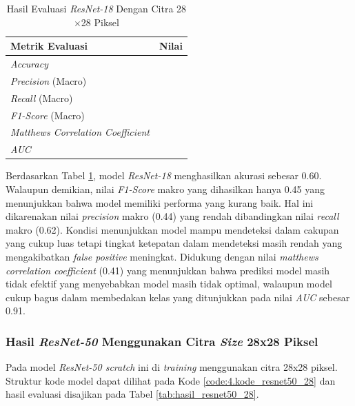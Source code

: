 \begin{table}[H]
    \centering
    \caption{Hasil Evaluasi \textit{ResNet-18} Dengan Citra 28$\times$28 Piksel}
    \label{tab:hasil_resnet18_28}
    \begin{tabular}{>{\raggedright\arraybackslash}m{} 
                    >{\centering\arraybackslash}m{}}
        \toprule
        \textbf{Metrik Evaluasi} & \textbf{Nilai} \\
        \midrule
        \textit{Accuracy} & 0.60 \\
        \textit{Precision} (Macro) & 0.44 \\
        \textit{Recall} (Macro) & 0.62 \\
        \textit{F1-Score} (Macro) & 0.45 \\
        \textit{Matthews Correlation Coefficient} & 0.41 \\
        \textit{AUC} & 0.91 \\
        \bottomrule
    \end{tabular}
\end{table}

Berdasarkan Tabel \ref{tab:hasil_resnet18_28}, model \textit{ResNet-18} 
menghasilkan akurasi sebesar 0.60. Walaupun demikian, nilai \textit{F1-Score} 
makro yang dihasilkan hanya 0.45 yang menunjukkan bahwa model memiliki 
performa yang kurang baik. Hal ini dikarenakan nilai \textit{precision} 
makro (0.44) yang rendah dibandingkan nilai \textit{recall} makro (0.62). 
Kondisi menunjukkan model mampu mendeteksi dalam cakupan yang cukup luas 
tetapi tingkat ketepatan dalam mendeteksi masih rendah yang mengakibatkan 
\textit{false positive} meningkat. Didukung dengan nilai 
\textit{matthews correlation coefficient} (0.41) yang menunjukkan bahwa 
prediksi model masih tidak efektif yang menyebabkan model masih tidak 
optimal, walaupun model cukup bagus dalam membedakan kelas yang ditunjukkan 
pada nilai \textit{AUC} sebesar 0.91. \par


\subsubsection{Hasil \textit{ResNet-50} Menggunakan Citra \textit{Size} 28x28 Piksel} \label{IV.Resnet50_28}
Pada model \textit{ResNet-50 scratch} ini di \textit{training} menggunakan 
citra 28x28 piksel. Struktur kode model dapat dilihat pada Kode \ref{code:4.kode_resnet50_28} dan hasil 
evaluasi disajikan pada Tabel \ref{tab:hasil_resnet50_28}. \par

